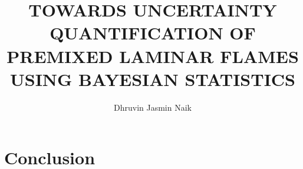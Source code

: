 \documentclass[10pt]{ubthesis}
\title{TOWARDS UNCERTAINTY QUANTIFICATION OF PREMIXED LAMINAR FLAMES USING BAYESIAN STATISTICS}
\author{Dhruvin Jasmin Naik}
\begin{document}
\begin{titlepage}
\maketitle
\end{titlepage}

\begin{ubfrontmatter}
\makecopyright
\cleardoublepage
\begin{acknowledgements}
  \doublespacing
  
\end{acknowledgements}

\singlespacing
\tableofcontents

\cleardoublepage
\listoffigures
\cleardoublepage
\listoftables
\cleardoublepage

\begin{abstract}

\end{abstract}
\end{ubfrontmatter}

\doublespacing





%

\chapter{Conclusion}




\begin{ubbackmatter}

\end{ubbackmatter}
\end{document}

